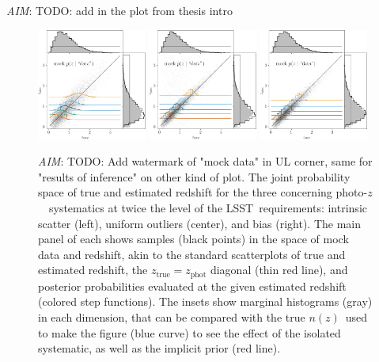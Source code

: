 \documentclass[iop]{emulateapj}
\newcommand{\todo}[3]{{\color{#2}\emph{#1}: #3}}
\newcommand{\aim}[1]{\todo{AIM}{red}{#1}}
\newcommand{\project}[1]{{\textsc{#1}}}
\newcommand{\lsst}{\project{LSST}}
\newcommand{\nz}{$n(z)$}
\newcommand{\pz}{photo-$z$~}
\begin{document}
\aim{TODO: add in the plot from thesis intro}

\begin{figure}
	\begin{center}
		\includegraphics[width=0.32\textwidth]{figures/chippr/thesis_hivarsig-mega_scatter.png}
		\includegraphics[width=0.32\textwidth]{figures/chippr/single_uout-mega_scatter.png}
		\includegraphics[width=0.32\textwidth]{figures/chippr/thesis_neghivarbias-mega_scatter.png}
		\caption{\aim{TODO: Add watermark of "mock data" in UL corner, same for "results of inference" on other kind of plot.}
			The joint probability space of true and estimated redshift for the three concerning \pz\ systematics at twice the level of the \lsst\ requirements: intrinsic scatter (left), uniform outliers (center), and bias (right).
			The main panel of each shows samples (black points) in the space of mock data and redshift, akin to the standard scatterplots of true and estimated redshift, the $z_{\mathrm{true}} = z_{\mathrm{phot}}$ diagonal (thin red line), and posterior probabilities evaluated at the given estimated redshift (colored step functions).
			The insets show marginal histograms (gray) in each dimension, that can be compared with the true \nz\ used to make the figure (blue curve) to see the effect of the isolated systematic, as well as the implicit prior (red line).
		}
		\label{fig:mega_scatter}
	\end{center}
\end{figure}
\end{document}
